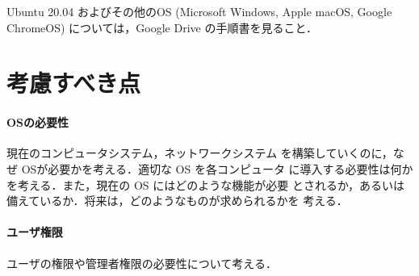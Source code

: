 Ubuntu 20.04 およびその他のOS (Microsoft Windows, Apple macOS, Google ChromeOS) については，Google Drive の手順書を見ること．

\section{考慮すべき点}

\paragraph{OSの必要性} 現在のコンピュータシステム，ネットワークシステム
を構築していくのに，なぜ OSが必要かを考える．適切な OS を各コンピュータ
に導入する必要性は何かを考える．また，現在の OS にはどのような機能が必要
とされるか，あるいは備えているか．将来は，どのようなものが求められるかを
考える．

\paragraph{ユーザ権限} ユーザの権限や管理者権限の必要性について考える．

